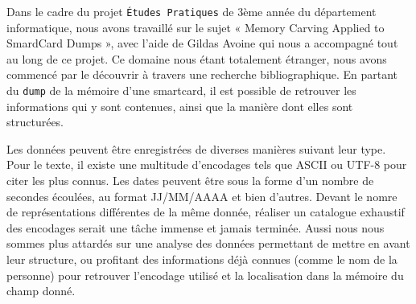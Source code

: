 Dans le cadre du projet \texttt{Études Pratiques} de 3ème année du département informatique, nous avons travaillé sur le sujet « Memory Carving Applied to SmardCard Dumps », avec l'aide de Gildas Avoine qui nous a accompagné tout au long de ce projet. Ce domaine nous étant totalement étranger, nous avons commencé par le découvrir à travers une recherche bibliographique. En partant du \texttt{dump} de la mémoire d'une smartcard, il est possible de retrouver les informations qui y sont contenues, ainsi que la manière dont elles sont structurées.

Les données peuvent être enregistrées de diverses manières suivant leur type. Pour le texte, il existe une multitude d'encodages tels que ASCII ou UTF-8 pour citer les plus connus. Les dates peuvent être sous la forme d'un nombre de secondes écoulées, au format JJ/MM/AAAA et bien d'autres. Devant le nomre de représentations différentes de la même donnée, réaliser un catalogue exhaustif des encodages serait une tâche immense et jamais terminée. Aussi nous nous sommes plus attardés sur une analyse des données permettant de mettre en avant leur structure, ou profitant des informations déjà connues (comme le nom de la personne) pour retrouver l'encodage utilisé et la localisation dans la mémoire du champ donné.
